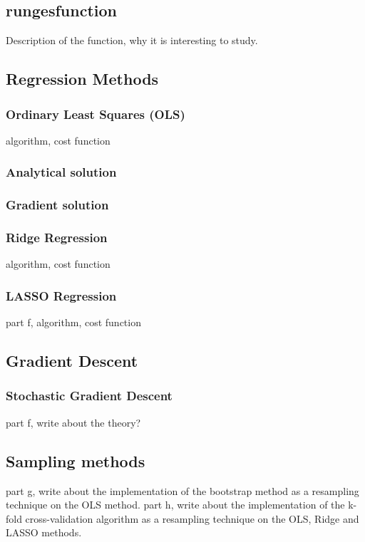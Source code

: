 \documentclass[amssymb,twocolumn,aps]{revtex4}
\begin{document}
\subsection{rungesfunction}
Description of the function, why it is interesting to study.
\subsection{Regression Methods}

\subsubsection{Ordinary Least Squares (OLS)}

algorithm, cost function
\subsubsection*{Analytical solution}


\subsubsection*{Gradient solution}

\subsubsection{Ridge Regression}
algorithm, cost function

\subsubsection{LASSO Regression}
part f, algorithm, cost function

\subsection{Gradient Descent}

\subsubsection{Stochastic Gradient Descent}
part f, write about the theory?


\subsection{Sampling methods}
part g, write about the implementation of the bootstrap method as a resampling technique on the OLS method.
part h, write about the implementation of the k-fold cross-validation algorithm as a resampling technique on the OLS, Ridge and LASSO methods.
\end{document}
